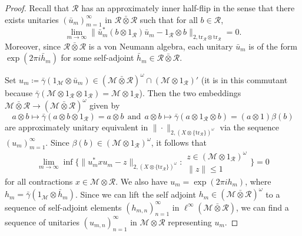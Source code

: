 \documentclass[a4paper,11pt]{amsart}
\theoremstyle{definition}
\numberwithin{equation}{section}
\numberwithin{theorem}{section}
\newcommand{\R}{\mathcal R}
\newcommand{\tr}{\mathrm{tr}}
\newcommand{\M}{\mathcal{M}}
\newcommand{\barotimes}{\bar\otimes}
\begin{document}
\begin{proof}
Recall that $\R$ has an approximately inner half-flip in the sense that there exists unitaries $(\bar{u}_m)_{m=1}^\infty$ in $\R \barotimes \R$ such that for all $b \in \R$,
\begin{equation}
	\lim_{m\to\infty} \|\bar{u}_m^*(b \otimes 1_\R) \bar{u}_m - 1_\R \otimes b\|_{2, \tr_{\R} \otimes \tr_{\R}} = 0.
\end{equation}
Moreover, since $\R \barotimes \R$ is a von Neumann algebra, each unitary $\bar{u}_m$ is of the form $\exp(2\pi i \bar{h}_m)$ for some self-adjoint $\bar{h}_m \in \R\barotimes\R$.

Set $u_m \coloneqq \bar{\gamma}(1_{\M} \otimes \bar{u}_m) \in (\M \barotimes \R)^\omega \cap (\M \otimes 1_\R)'$ (it is in this commutant because $\bar\gamma(\M \otimes 1_\R \otimes 1_\R) = \M \otimes 1_\R$).
Then the two embeddings $\M \barotimes \R \rightarrow (\M \barotimes \R)^\omega$ given by 
\begin{equation}
    a \otimes b \mapsto \bar{\gamma}(a \otimes b \otimes 1_\R)=a\otimes b\ \ \text{and}\ \  a \otimes b \mapsto \bar{\gamma}(a \otimes 1_\R \otimes b)=(a\otimes 1)\beta(b)
\end{equation}
are approximately unitary equivalent in $\|\cdot\|_{2,(X \otimes \{\tr_\R\})^\omega}$ via the sequence $(u_m)_{m=1}^\infty$.
Since $\beta(b)\in (\M\otimes 1_{\R})^\omega$, it follows that
\begin{equation}\label{eqn:inf-formula}
	\lim_{m\to\infty} \inf\Big\{ \|u_m^* x u_m - z\|_{2,(X \otimes \{\tr_\R\})^\omega}: \begin{matrix}z \in (\M \otimes 1_\R)^\omega \\ \|z\| \leq 1\end{matrix}\Big\} = 0
\end{equation}
for all contractions $x \in \M \otimes \R$. We also have $u_m = \exp(2\pi i h_m)$, where $h_m = \bar{\gamma}(1_{\M} \otimes \bar{h}_m)$. Since we can lift the self adjoint $h_m \in (\M \barotimes \R)^\omega$ to a sequence of self-adjoint elements $(h_{m,n})_{n=1}^\infty$ in $\ell^\infty(\M \barotimes \R)$, we can find a sequence of unitaries $(u_{m,n})_{n=1}^\infty$ in $\M \otimes \R$ representing $u_m$. 


\end{proof}
\end{document}
